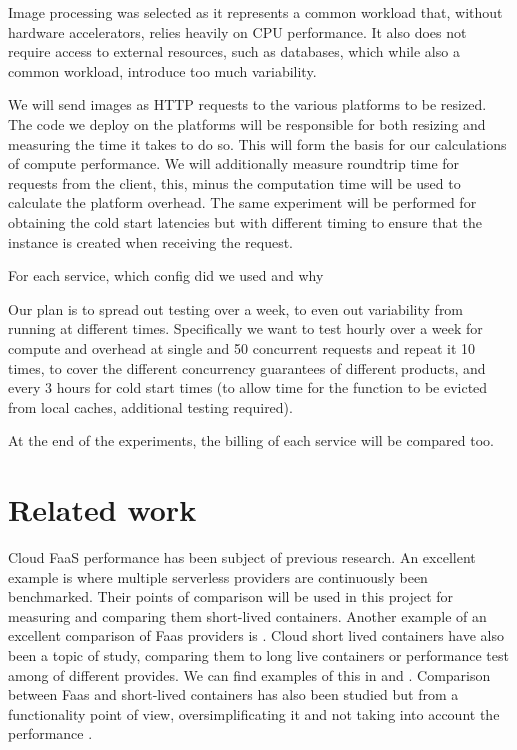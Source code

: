 \documentclass[11pt]{article}
\begin{document}
Image processing was selected as it represents a common workload that, without hardware accelerators, relies heavily on CPU performance. It also does not require access to external resources, such as databases, which while also a common workload, introduce too much variability.

We will send images as HTTP requests to the various platforms to be resized. The code we deploy on the platforms will be responsible for both resizing and measuring the time it takes to do so. This will form the basis for our calculations of compute performance. We will additionally measure roundtrip time for requests from the client, this, minus the computation time will be used to calculate the platform overhead.  The same experiment will be performed for obtaining the cold start latencies but with different timing to ensure that the instance is created when receiving the request.








For each service, which config did we used and why








Our plan is to spread out testing over a week, to even out variability from running at different times. Specifically we want to test hourly over a week for compute and overhead at single and 50 concurrent requests and repeat it 10 times, to cover the different concurrency guarantees of different products, and every 3 hours for cold start times (to allow time for the function to be evicted from local caches, additional testing required).

At the end of the experiments, the billing of each service will be compared too.






\section{Related work}
Cloud FaaS performance has been subject of previous research. An excellent example is \cite{aa} where multiple serverless providers are continuously been benchmarked. Their points of comparison will be used in this project for measuring and comparing them short-lived containers. Another example of an excellent comparison of Faas providers is \cite{bb}. Cloud short lived containers have also been a topic of study, comparing them to long live containers or performance test among of different provides. We can find examples of this in \cite{cc} and \cite{dd}. Comparison between Faas and short-lived containers has also been studied but from a functionality point of view, oversimplificating it and not taking into account the performance \cite{ee}\cite{ff}\cite{gg}.
\end{document}
